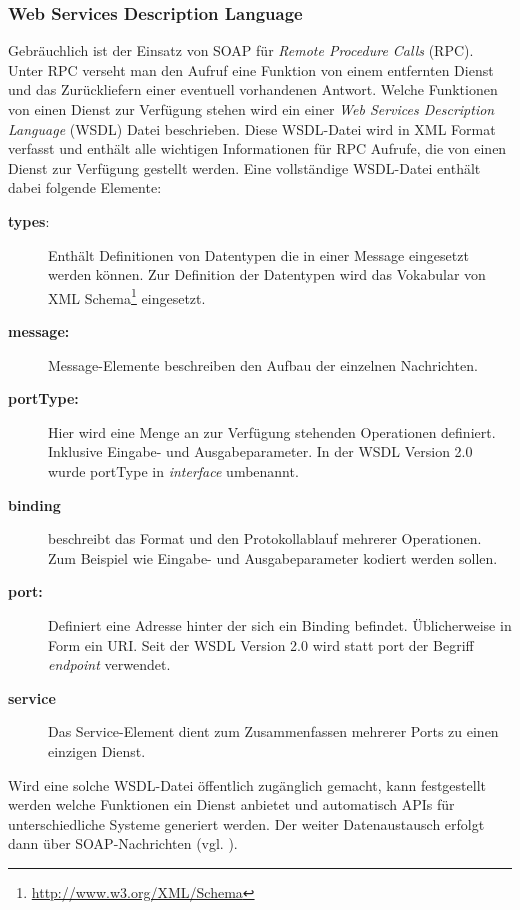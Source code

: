 \subsubsection{Web Services Description Language} %
\label{ssub:wsdl}


Gebräuchlich ist der Einsatz von SOAP für \emph{Remote Procedure Calls} (RPC). Unter RPC verseht man den Aufruf eine Funktion von einem entfernten Dienst und das Zurückliefern einer eventuell vorhandenen Antwort. Welche Funktionen von einen Dienst zur Verfügung stehen wird ein einer \emph{Web Services Description Language} (WSDL) Datei beschrieben. Diese WSDL-Datei wird in XML Format verfasst und enthält alle wichtigen Informationen für RPC Aufrufe, die von einen Dienst zur Verfügung gestellt werden. Eine vollständige WSDL-Datei enthält dabei folgende Elemente:

\begin{description}
    \item[\textbf{types}:] Enthält Definitionen von Datentypen die in einer Message eingesetzt werden können. Zur Definition der Datentypen wird das Vokabular von XML Schema\footnote{\url{http://www.w3.org/XML/Schema}} eingesetzt.
    \item[\textbf{message:}] Message-Elemente beschreiben den Aufbau der einzelnen Nachrichten.
    \item[\textbf{portType:}] Hier wird eine Menge an zur Verfügung stehenden Operationen definiert. Inklusive Eingabe- und Ausgabeparameter. In der WSDL Version 2.0 wurde portType in \emph{interface} umbenannt.
    \item[\textbf{binding}] beschreibt das Format und den Protokollablauf mehrerer Operationen. Zum Beispiel wie Eingabe- und Ausgabeparameter kodiert werden sollen. 
    \item[\textbf{port:}] Definiert eine Adresse hinter der sich ein Binding befindet. Üblicherweise in Form ein URI. Seit der WSDL Version 2.0 wird statt port der Begriff \emph{endpoint} verwendet.
    \item[\textbf{service}] Das Service-Element dient zum Zusammenfassen mehrerer Ports zu einen einzigen Dienst.
\end{description}

Wird eine solche WSDL-Datei öffentlich zugänglich gemacht, kann festgestellt werden welche Funktionen ein Dienst anbietet und automatisch APIs für unterschiedliche Systeme generiert werden. Der weiter Datenaustausch erfolgt dann über SOAP-Nachrichten (vgl. \cite{wsdl2001}).

